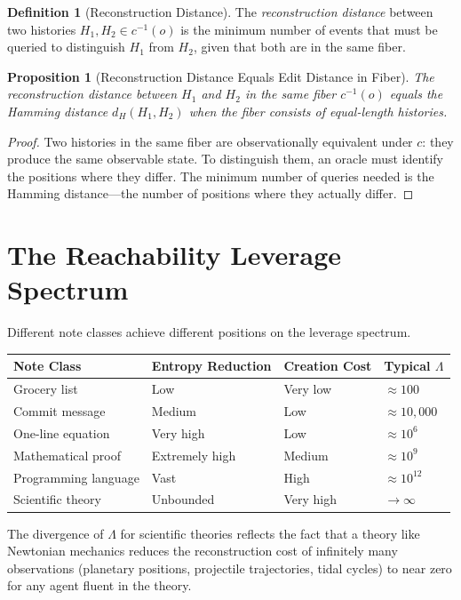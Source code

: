 \documentclass[12pt, a4paper, openany]{book}
\theoremstyle{plain}
\newtheorem{proposition}[theorem]{Proposition}
\theoremstyle{definition}
\newtheorem{definition}[theorem]{Definition}
\theoremstyle{remark}
\begin{document}
\begin{definition}[Reconstruction Distance]
The \emph{reconstruction distance} between two histories $H_1, H_2 \in c^{-1}(o)$
is the minimum number of events that must be queried to distinguish $H_1$ from
$H_2$, given that both are in the same fiber.
\end{definition}

\begin{proposition}[Reconstruction Distance Equals Edit Distance in Fiber]
The reconstruction distance between $H_1$ and $H_2$ in the same fiber $c^{-1}(o)$
equals the Hamming distance $d_H(H_1, H_2)$ when the fiber consists of
equal-length histories.
\end{proposition}

\begin{proof}
Two histories in the same fiber are observationally equivalent under $c$:
they produce the same observable state. To distinguish them, an oracle must
identify the positions where they differ. The minimum number of queries needed
is the Hamming distance---the number of positions where they actually differ.
\end{proof}

\section{The Reachability Leverage Spectrum}

Different note classes achieve different positions on the leverage spectrum.

\begin{center}
\begin{tabular}{llll}
\toprule
Note Class & Entropy Reduction & Creation Cost & Typical $\Lambda$ \\
\midrule
Grocery list & Low & Very low & $\approx 100$ \\
Commit message & Medium & Low & $\approx 10{,}000$ \\
One-line equation & Very high & Low & $\approx 10^6$ \\
Mathematical proof & Extremely high & Medium & $\approx 10^9$ \\
Programming language & Vast & High & $\approx 10^{12}$ \\
Scientific theory & Unbounded & Very high & $\to \infty$ \\
\bottomrule
\end{tabular}
\end{center}

The divergence of $\Lambda$ for scientific theories reflects the fact that a
theory like Newtonian mechanics reduces the reconstruction cost of infinitely
many observations (planetary positions, projectile trajectories, tidal cycles)
to near zero for any agent fluent in the theory.
\end{document}
